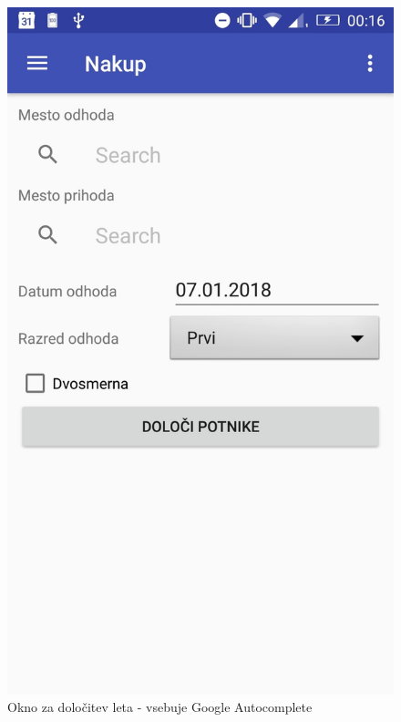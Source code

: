 \documentclass[11pt,a4paper]{article}
\begin{document}
\begin{figure}[htb]
	\centerline{\includegraphics[width=1.0\textwidth]{nakupScreen.jpg}}
	\caption{Okno za določitev leta - vsebuje Google Autocomplete}
	\label{sl:koncept}
\end{figure}
\end{document}
